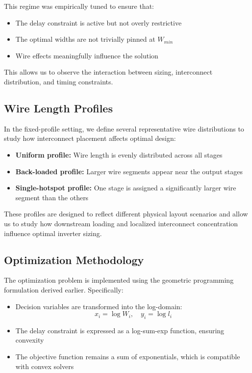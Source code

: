 \documentclass{article}
\begin{document}
This regime was empirically tuned to ensure that:
\begin{itemize}
    \item The delay constraint is active but not overly restrictive
    \item The optimal widths are not trivially pinned at $W_{min}$
    \item Wire effects meaningfully influence the solution
\end{itemize}

This allows us to observe the interaction between sizing, interconnect distribution, and timing constraints.

\subsection{Wire Length Profiles}

In the fixed-profile setting, we define several representative wire distributions to study how interconnect placement affects optimal design:

\begin{itemize}
    \item \textbf{Uniform profile:} Wire length is evenly distributed across all stages
    \item \textbf{Back-loaded profile:} Larger wire segments appear near the output stages
    \item \textbf{Single-hotspot profile:} One stage is assigned a significantly larger wire segment than the others
\end{itemize}

These profiles are designed to reflect different physical layout scenarios and allow us to study how downstream loading and localized interconnect concentration influence optimal inverter sizing.
\subsection{Optimization Methodology}

The optimization problem is implemented using the geometric programming formulation derived earlier. Specifically:

\begin{itemize}
    \item Decision variables are transformed into the log-domain:
    \[ x_i = \log W_i, \quad y_i = \log l_i \]
    
    \item The delay constraint is expressed as a log-sum-exp function, ensuring convexity
    
    \item The objective function remains a sum of exponentials, which is compatible with convex solvers
\end{itemize}
\end{document}
